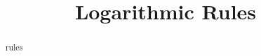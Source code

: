 \documentclass{ximera}
\title{Logarithmic Rules}
\begin{document}
\begin{abstract}
rules
\end{abstract}
\maketitle
\end{document}

